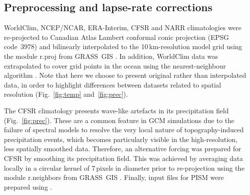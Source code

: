 
\subsection{Preprocessing and lapse-rate corrections}

WorldClim, NCEP/NCAR, ERA-Interim, CFSR and NARR climatologies were re-projected to Canadian Atlas Lambert conformal conic projection (EPSG code~3978) and bilinearly interpolated to the 10\,km-resolution model grid using the module r.proj from GRASS~GIS \citep{soft:grass}. In addition, WorldClim data was extrapolated to cover grid points in the ocean using the nearest-neighbour algorithm \citep{soft:scipy}. Note that here we choose to present original rather than interpolated data, in order to highlight differences between datasets related to spatial resolution (Fig.~\ref{fig:temp} and~\ref{fig:prec}).

The CFSR climatology presents wave-like artefacts in its precipitation field (Fig.~\ref{fig:prec}). These are a common feature in GCM simulations due to the failure of spectral models to resolve the very local nature of topography-induced precipitation events, which becomes particularly visible in the high-resolution, less spatially smoothed data. Therefore, an alternative forcing was prepared for CFSR by smoothing its precipitation field. This was achieved by averaging data locally in a circular kernel of 7\,pixels in diameter prior to re-projection using the module r.neighbors from GRASS~GIS \citep{soft:grass}. Finally, input files for PISM were prepared using \citet{web:nc4py}.
